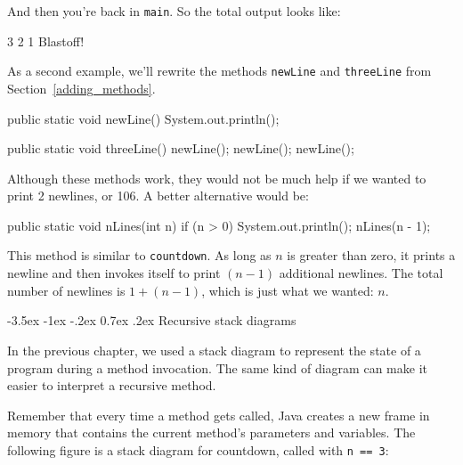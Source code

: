 \documentclass[12pt]{book}
\makeatletter
\theoremstyle{exercise}
\newcommand{\java}[1]{\verb"#1"}
\renewcommand{\section}{\@startsection {section}{1}{\z@}%
    {-3.5ex \@plus -1ex \@minus -.2ex}%
    {0.7ex \@plus.2ex}%
    {\normalfont\Large\bfseries}}
\newcommand{\java}[1]{\lstinline{#1}} %
\makeatother
\begin{document}
And then you're back in \java{main}.
So the total output looks like:

\begin{stdout}
3
2
1
Blastoff!
\end{stdout}

As a second example, we'll rewrite the methods \java{newLine} and \java{threeLine} from Section~\ref{adding_methods}.

\begin{code}
    public static void newLine() {
        System.out.println();
    }

    public static void threeLine() {
        newLine();
        newLine();
        newLine();
    }
\end{code}


Although these methods work, they would not be much help if we wanted to print 2 newlines, or 106.
A better alternative would be:

\begin{code}
    public static void nLines(int n) {
        if (n > 0) {
            System.out.println();
            nLines(n - 1);
        }
    }
\end{code}

This method is similar to \java{countdown}.
As long as $n$ is greater than zero, it prints a newline and then invokes itself to print $(n-1)$ additional newlines.
The total number of newlines is $1 + (n - 1)$, which is just what we wanted: $n$.


\section{Recursive stack diagrams}


In the previous chapter, we used a stack diagram to represent the state of a program during a method invocation.
The same kind of diagram can make it easier to interpret a recursive method.

Remember that every time a method gets called, Java creates a new frame in memory that contains the current method's parameters and variables.
The following figure is a stack diagram for countdown, called with \java{n == 3}:
\end{document}
